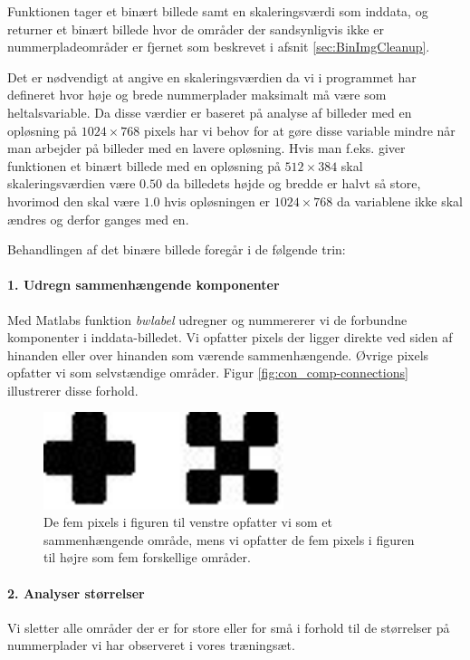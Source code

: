 Funktionen tager et binært billede samt en skaleringsværdi som inddata, og returner et binært billede hvor de områder der sandsynligvis ikke er nummerpladeområder er fjernet som beskrevet i afsnit \vref{sec:BinImgCleanup}.

Det er nødvendigt at angive en skaleringsværdien da vi i programmet har defineret hvor høje og brede nummerplader maksimalt må være som heltalsvariable. Da disse værdier er baseret på analyse af billeder med en opløsning på $1024 \times 768$ pixels har vi behov for at gøre disse variable mindre når man arbejder på billeder med en lavere opløsning. Hvis man f.eks. giver funktionen et binært billede med en opløsning på $512 \times 384$ skal skaleringsværdien være $0.50$ da billedets højde og bredde er halvt så store, hvorimod den skal være $1.0$ hvis opløsningen er $1024 \times 768$ da variablene ikke skal ændres og derfor ganges med en.

Behandlingen af det binære billede foregår i de følgende trin:

\paragraph{1. Udregn sammenhængende komponenter}
Med Matlabs funktion \textit{bwlabel} udregner og nummererer vi de forbundne komponenter i inddata-billedet. Vi opfatter pixels der ligger direkte ved siden af hinanden eller over hinanden som værende sammenhængende. Øvrige pixels opfatter vi som selvstændige områder. Figur \vref{fig:con_comp-connections} illustrerer disse forhold.

\begin{figure}[htp]
\centering
\includegraphics[width=7cm]{implementation/illu/con_comp-connections.jpg}
\caption{De fem pixels i figuren til venstre opfatter vi som et sammenhængende område, mens vi opfatter de fem pixels i figuren til højre som fem forskellige områder.}
\label{fig:con_comp-connections}
\end{figure}

\paragraph{2. Analyser størrelser}
Vi sletter alle områder der er for store eller for små i forhold til de størrelser på nummerplader vi har observeret i vores træningsæt.

